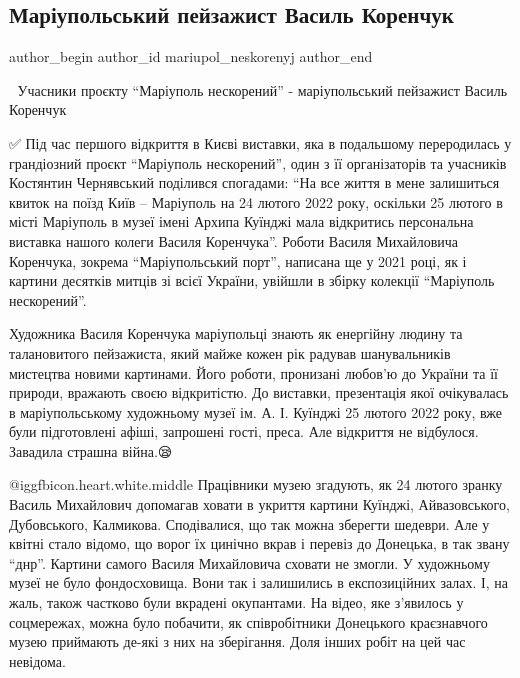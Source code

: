  
 
 
 
 

\subsection{Маріупольський пейзажист Василь Коренчук}
\label{sec:07_08_2023.fb.mariupol_neskorenyj.1.mariupol_pejzazhist_vasyl_korenchuk}

\ifcmt
 author_begin
   author_id mariupol_neskorenyj
 author_end
\fi

📎 Учасники проєкту \enquote{Маріуполь нескорений} - маріупольський пейзажист Василь Коренчук

✅️ Під час першого відкриття в Києві виставки, яка в подальшому переродилась у
грандіозний проєкт \enquote{Маріуполь нескорений}, один з її організаторів та учасників
Костянтин Чернявський поділився спогадами: \enquote{На все життя в мене залишиться
квиток на поїзд Київ – Маріуполь на 24 лютого 2022 року, оскільки 25 лютого в
місті Маріуполь в музеї імені Архипа Куїнджі мала відкритись персональна
виставка нашого колеги Василя Коренчука}. Роботи Василя Михайловича Коренчука,
зокрема \enquote{Маріупольський порт}, написана ще у 2021 році, як і картини десятків
митців зі всієї України, увійшли в збірку колекції \enquote{Маріуполь нескорений}.

Художника Василя Коренчука маріупольці знають як енергійну людину та
талановитого пейзажиста, який майже кожен рік радував шанувальників мистецтва
новими картинами. Його роботи, пронизані любов'ю до України та її природи,
вражають своєю відкритістю. До виставки, презентація якої очікувалась в
маріупольському художньому музеї ім. А. І. Куїнджі 25 лютого 2022 року, вже були
підготовлені афіші, запрошені гості, преса. Але відкриття не відбулося.
Завадила страшна війна.😪

@igg{fbicon.heart.white.middle} Працівники музею згадують, як 24 лютого зранку Василь Михайлович допомагав
ховати в укриття картини Куїнджі, Айвазовського, Дубовського, Калмикова.
Сподівалися, що так можна зберегти шедеври. Але у квітні стало відомо, що ворог
їх цинічно вкрав і перевіз до Донецька, в так звану \enquote{днр}. Картини самого
Василя Михайловича сховати не змогли. У художньому музеї не було фондосховища.
Вони так і залишились в експозиційних залах. І, на жаль, також частково були
вкрадені окупантами. На відео, яке з'явилось у соцмережах, можна було побачити,
як співробітники Донецького краєзнавчого музею приймають де-які з них на
зберігання. Доля інших робіт на цей час невідома.

